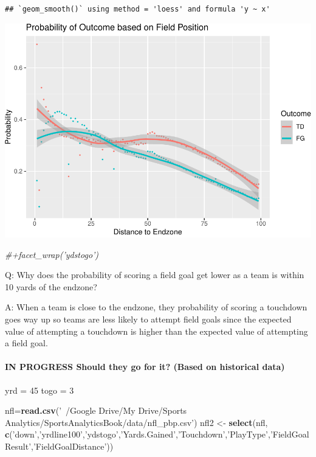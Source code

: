 \documentclass[]{article}
\newenvironment{Shaded}{\begin{snugshade}}{\end{snugshade}}
\newcommand{\CommentTok}[1]{\textcolor[rgb]{0.56,0.35,0.01}{\textit{#1}}}
\newcommand{\DecValTok}[1]{\textcolor[rgb]{0.00,0.00,0.81}{#1}}
\newcommand{\KeywordTok}[1]{\textcolor[rgb]{0.13,0.29,0.53}{\textbf{#1}}}
\newcommand{\NormalTok}[1]{#1}
\newcommand{\StringTok}[1]{\textcolor[rgb]{0.31,0.60,0.02}{#1}}
\let\oldparagraph\paragraph
\renewcommand{\paragraph}[1]{\oldparagraph{#1}\mbox{}}
\begin{document}
\begin{verbatim}
## `geom_smooth()` using method = 'loess' and formula 'y ~ x'
\end{verbatim}

\includegraphics{22-isaac_files/figure-latex/unnamed-chunk-11-1.pdf}

\begin{Shaded}
\begin{Highlighting}[]
\CommentTok{#+facet_wrap('ydstogo')}
\end{Highlighting}
\end{Shaded}

Q: Why does the probability of scoring a field goal get lower as a team
is within 10 yards of the endzone?

A: When a team is close to the endzone, they probability of scoring a
touchdown goes way up so teams are less likely to attempt field goals
since the expected value of attempting a touchdown is higher than the
expected value of attempting a field goal.

\hypertarget{in-progress-should-they-go-for-it-based-on-historical-data}{%
\paragraph{IN PROGRESS Should they go for it? (Based on historical
data)}\label{in-progress-should-they-go-for-it-based-on-historical-data}}

\begin{Shaded}
\begin{Highlighting}[]
\NormalTok{yrd =}\StringTok{ }\DecValTok{45}
\NormalTok{togo =}\StringTok{ }\DecValTok{3}


\NormalTok{nfl=}\KeywordTok{read.csv}\NormalTok{(}\StringTok{'~/Google Drive/My Drive/Sports Analytics/SportsAnalyticsBook/data/nfl_pbp.csv'}\NormalTok{)}
\NormalTok{nfl2 <-}\StringTok{ }\KeywordTok{select}\NormalTok{(nfl, }\KeywordTok{c}\NormalTok{(}\StringTok{'down'}\NormalTok{,}\StringTok{'yrdline100'}\NormalTok{,}\StringTok{'ydstogo'}\NormalTok{,}\StringTok{'Yards.Gained'}\NormalTok{,}\StringTok{'Touchdown'}\NormalTok{,}\StringTok{'PlayType'}\NormalTok{,}\StringTok{'FieldGoalResult'}\NormalTok{,}\StringTok{'FieldGoalDistance'}\NormalTok{))}
\end{Highlighting}
\end{Shaded}
\end{document}
